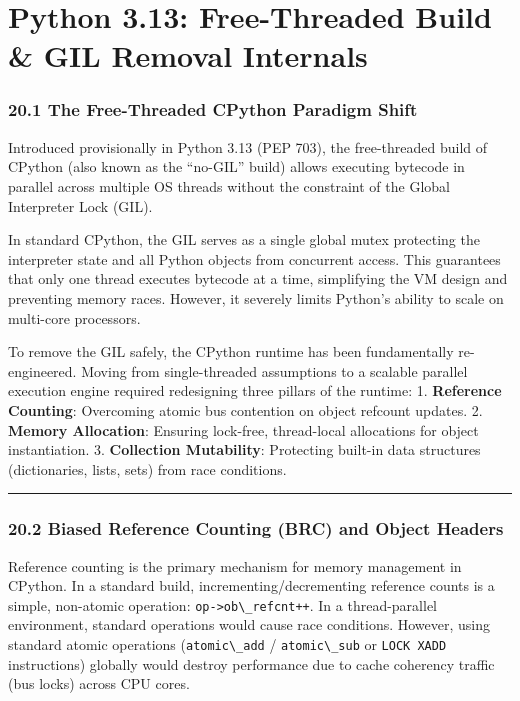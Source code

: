 \hypertarget{python-3.13-free-threaded-build-gil-removal-internals}{%
\chapter{Python 3.13: Free-Threaded Build \& GIL Removal
Internals}\label{python-3.13-free-threaded-build-gil-removal-internals}}

\hypertarget{the-free-threaded-cpython-paradigm-shift}{%
\subsection{20.1 The Free-Threaded CPython Paradigm
Shift}\label{the-free-threaded-cpython-paradigm-shift}}

Introduced provisionally in Python 3.13 (PEP 703), the free-threaded
build of CPython (also known as the ``no-GIL'' build) allows executing
bytecode in parallel across multiple OS threads without the constraint
of the Global Interpreter Lock (GIL).

In standard CPython, the GIL serves as a single global mutex protecting
the interpreter state and all Python objects from concurrent access.
This guarantees that only one thread executes bytecode at a time,
simplifying the VM design and preventing memory races. However, it
severely limits Python's ability to scale on multi-core processors.

To remove the GIL safely, the CPython runtime has been fundamentally
re-engineered. Moving from single-threaded assumptions to a scalable
parallel execution engine required redesigning three pillars of the
runtime: 1. \textbf{Reference Counting}: Overcoming atomic bus
contention on object refcount updates. 2. \textbf{Memory Allocation}:
Ensuring lock-free, thread-local allocations for object instantiation.
3. \textbf{Collection Mutability}: Protecting built-in data structures
(dictionaries, lists, sets) from race conditions.

\begin{center}\rule{0.5\linewidth}{0.5pt}\end{center}

\hypertarget{biased-reference-counting-brc-and-object-headers}{%
\subsection{20.2 Biased Reference Counting (BRC) and Object
Headers}\label{biased-reference-counting-brc-and-object-headers}}

Reference counting is the primary mechanism for memory management in
CPython. In a standard build, incrementing/decrementing reference counts
is a simple, non-atomic operation:
\passthrough{\lstinline!op->ob\_refcnt++!}. In a thread-parallel
environment, standard operations would cause race conditions. However,
using standard atomic operations (\passthrough{\lstinline!atomic\_add!}
/ \passthrough{\lstinline!atomic\_sub!} or
\passthrough{\lstinline!LOCK XADD!} instructions) globally would destroy
performance due to cache coherency traffic (bus locks) across CPU cores.

